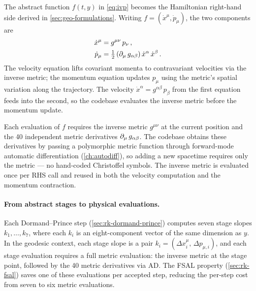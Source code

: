 The abstract function $f(t, y)$ in \cref{eq:ivp} becomes the
Hamiltonian right-hand side derived in \cref{sec:geo-formulations}.
Writing $f = (\dot{x}^\mu, \dot{p}_\mu)$, the two components are
%
\begin{equation}
  \begin{aligned}
  \dot{x}^\mu &= g^{\mu\nu}\,p_\nu \,, \\
  \dot{p}_\mu &= \tfrac{1}{2}\,(\partial_{\mu}\,g_{\alpha\beta})\,
    \dot{x}^\alpha\,\dot{x}^\beta \,.
  \end{aligned}
  \label{eq:geodesic-rhs}
\end{equation}
%
The velocity equation lifts covariant momenta to contravariant
velocities via the inverse metric; the momentum equation updates
$p_\mu$ using the metric's spatial variation along the trajectory.
The velocity $\dot{x}^\alpha = g^{\alpha\beta}\,p_\beta$ from the
first equation feeds into the second, so the codebase evaluates the
inverse metric before the momentum update.

Each evaluation of $f$ requires the inverse metric $g^{\mu\nu}$ at
the current position and the 40 independent metric derivatives
$\partial_{\mu}\,g_{\alpha\beta}$.  The codebase obtains these derivatives
by passing a polymorphic metric function through forward-mode automatic
differentiation (\cref{ch:autodiff}), so adding a new spacetime
requires only the metric --- no hand-coded Christoffel symbols.  The
inverse metric is evaluated once per RHS call and reused in both the
velocity computation and the momentum contraction.

\paragraph{From abstract stages to physical evaluations.}

Each Dormand--Prince step (\cref{sec:rk-dormand-prince}) computes
seven stage slopes $k_1, \ldots, k_7$, where each $k_i$ is an
eight-component vector of the same dimension as $y$.  In the geodesic
context, each stage slope is a pair
$k_i = (\Delta x^\mu_i,\, \Delta p_{\mu,i})$, and each stage
evaluation requires a full metric evaluation: the inverse metric at
the stage point, followed by the 40 metric derivatives via AD.  The
FSAL property (\cref{sec:rk-fsal}) saves one of these evaluations per
accepted step, reducing the per-step cost from seven to six metric
evaluations.

